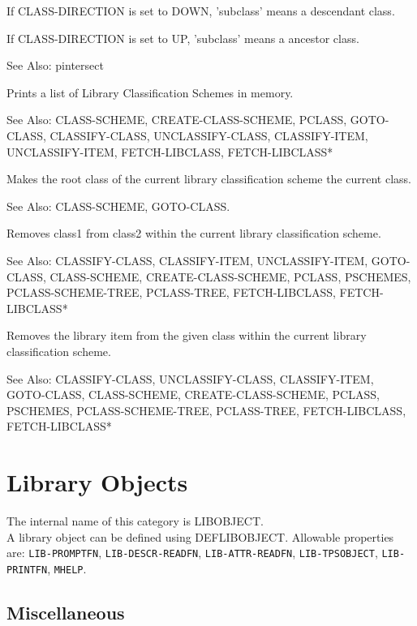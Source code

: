 \begin{description}
If CLASS-DIRECTION is set to DOWN, 'subclass' means a descendant class.

If CLASS-DIRECTION is set to UP, 'subclass' means a ancestor class.

See Also: pintersect

\item[PSCHEMES]  
Prints a list of Library Classification Schemes in memory.

See Also: CLASS-SCHEME, CREATE-CLASS-SCHEME, PCLASS, GOTO-CLASS,
CLASSIFY-CLASS, UNCLASSIFY-CLASS, CLASSIFY-ITEM, UNCLASSIFY-ITEM,
FETCH-LIBCLASS, FETCH-LIBCLASS*

\item[ROOT-CLASS]  
Makes the root class of the current library classification scheme
the current class.

See Also: CLASS-SCHEME, GOTO-CLASS.

\item[UNCLASSIFY-CLASS]  
Removes class1 from class2 within the current library classification scheme.

See Also: CLASSIFY-CLASS, CLASSIFY-ITEM, UNCLASSIFY-ITEM,
GOTO-CLASS, CLASS-SCHEME, CREATE-CLASS-SCHEME, PCLASS, PSCHEMES,
PCLASS-SCHEME-TREE, PCLASS-TREE, FETCH-LIBCLASS, FETCH-LIBCLASS*

\item[UNCLASSIFY-ITEM]  
Removes the library item from the given class within the
current library classification scheme.

See Also: CLASSIFY-CLASS, UNCLASSIFY-CLASS, CLASSIFY-ITEM,
GOTO-CLASS, CLASS-SCHEME, CREATE-CLASS-SCHEME, PCLASS, PSCHEMES,
PCLASS-SCHEME-TREE, PCLASS-TREE, FETCH-LIBCLASS, FETCH-LIBCLASS*
\item
\end{description}
\chapter{Library Objects}
The internal name of this category is 
LIBOBJECT.\\
A library object can be defined using DEFLIBOBJECT.
Allowable properties are: \texttt{LIB-PROMPTFN}, \texttt{LIB-DESCR-READFN}, \texttt{LIB-ATTR-READFN}, \texttt{LIB-TPSOBJECT}, \texttt{LIB-PRINTFN}, \texttt{MHELP}.

\section{Miscellaneous}

